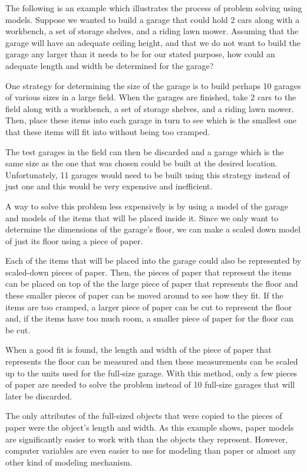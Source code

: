 \documentclass[12pt,oneside]{book}
\begin{document}
The following is an example which illustrates the process of problem solving using models. Suppose we wanted to build a garage that could hold 2 cars along with a workbench, a set of storage shelves, and a riding lawn mower. Assuming that the garage will have an adequate ceiling height, and that we do not want to build the garage any larger than it needs to be for our stated purpose, how could an adequate length and width be determined for the garage? 

One strategy for determining the size of the garage is to build perhaps 10 garages of various sizes in a large field. When the garages are finished, take 2 cars to the field along with a workbench, a set of storage shelves, and a riding lawn mower. Then, place these items into each garage in turn to see which is the smallest one that these items will fit into without being too cramped.


The test garages in the field can then be discarded and a garage which is the same size as the one that was chosen could be built at the desired location. Unfortunately, 11 garages would need to be built using this strategy instead of just one and this would be very expensive and inefficient. 

A way to solve this problem less expensively is by using a model of the garage and models of the items that will be placed inside it. Since we only want to determine the dimensions of the garage's floor, we can make a scaled down model of just its floor using a piece of paper. 

Each of the items that will be placed into the garage could also be represented by scaled{}-down pieces of paper. Then, the pieces of paper that represent the items can be placed on top of the the large piece of paper that represents the floor and these smaller pieces of paper can be moved around to see how they fit. If the items are too cramped, a larger piece of paper can be cut to represent the floor and, if the items have too much room, a smaller piece of paper for the floor can be cut. 

When a good fit is found, the length and width of the piece of paper that represents the floor can be measured and then these measurements can be scaled up to the units used for the full{}-size garage. With this method, only a few pieces of paper are needed to solve the problem instead of 10 full{}-size garages that will later be discarded. 

The only attributes of the full{}-sized objects that were copied to the pieces of paper were the object's length and width. As this example shows, paper models are significantly easier to work with than the objects they represent. However, computer variables are even easier to use for modeling than paper or almost any other kind of modeling mechanism.
\end{document}
